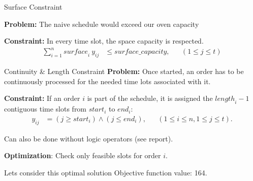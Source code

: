 \documentclass[presentation]{beamer}
\begin{document}
\begin{frame}{Surface Constraint}

\textbf{Problem:} The naive schedule would exceed our oven capacity

\textbf{Constraint:} In every time slot, the space capacity is respected.
    \begin{align}
        \sum^n_{i=1}\mathit{surface}_i \: y_{ij} &\leq \mathit{surface\_capacity}, &&(1 \leq j \leq t)
    \end{align}
\end{frame}

\begin{frame}{Continuity \& Length Constraint}
\textbf{Problem:} Once started, an order has to be continuously processed for the needed time lots associated with it. 

\textbf{Constraint:} If an order $i$ is part of the schedule, it is assigned the $\mathit{length}_i - 1$ contiguous time slots from $\mathit{start}_i$ to $\mathit{end}_i$:
    \begin{align}
        y_{ij} &= (j \geq \mathit{start}_i) \land (j \leq \mathit{end}_i), &&(1 \leq i \leq n, 1 \leq j \leq t).
   \end{align}

   Can also be done without logic operators (see report).

    \textbf{Optimization}: Check only feasible slots for order $i$.
   
\end{frame}


\begin{frame}{Lets consider this optimal solution}
Objective function value: 164.
\begin{figure}[H]
\centering

\end{figure}  
\end{frame}
\end{document}
